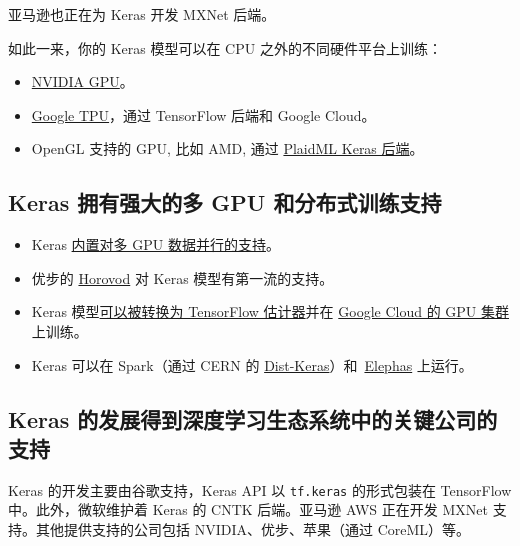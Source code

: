 亚马逊也正在为 Keras 开发 MXNet 后端。

如此一来，你的 Keras 模型可以在 CPU 之外的不同硬件平台上训练：

\begin{itemize}
\tightlist
\item
  \href{https://developer.nvidia.com/deep-learning}{NVIDIA GPU}。
\item
  \href{https://cloud.google.com/tpu/}{Google TPU}，通过 TensorFlow
  后端和 Google Cloud。
\item
  OpenGL 支持的 GPU, 比如 AMD, 通过
  \href{https://github.com/plaidml/plaidml}{PlaidML Keras 后端}。
\end{itemize}


\subsection{Keras 拥有强大的多 GPU
和分布式训练支持}

\begin{itemize}
\tightlist
\item
  Keras \hyperref[multi-gpu-model]{内置对多 GPU
  数据并行的支持}。
\item
  优步的 \href{https://github.com/uber/horovod}{Horovod} 对 Keras
  模型有第一流的支持。
\item
  Keras
  模型\href{https://www.tensorflow.org/versions/master/api_docs/python/tf/keras/estimator/model_to_estimator}{可以被转换为
  TensorFlow 估计器}并在
  \href{https://cloud.google.com/solutions/running-distributed-tensorflow-on-compute-engine}{Google
  Cloud 的 GPU 集群}上训练。
\item
  Keras 可以在 Spark（通过 CERN 的
  \href{https://github.com/cerndb/dist-keras}{Dist-Keras}）和~\href{https://github.com/maxpumperla/elephas}{Elephas}
  上运行。
\end{itemize}


\subsection{Keras
的发展得到深度学习生态系统中的关键公司的支持}\label{keras-ux7684ux53d1ux5c55ux5f97ux5230ux6df1ux5ea6ux5b66ux4e60ux751fux6001ux7cfbux7edfux4e2dux7684ux5173ux952eux516cux53f8ux7684ux652fux6301}

Keras 的开发主要由谷歌支持，Keras API 以 \texttt{tf.keras} 的形式包装在
TensorFlow 中。此外，微软维护着 Keras 的 CNTK 后端。亚马逊 AWS 正在开发
MXNet 支持。其他提供支持的公司包括 NVIDIA、优步、苹果（通过 CoreML）等。

\newpage
